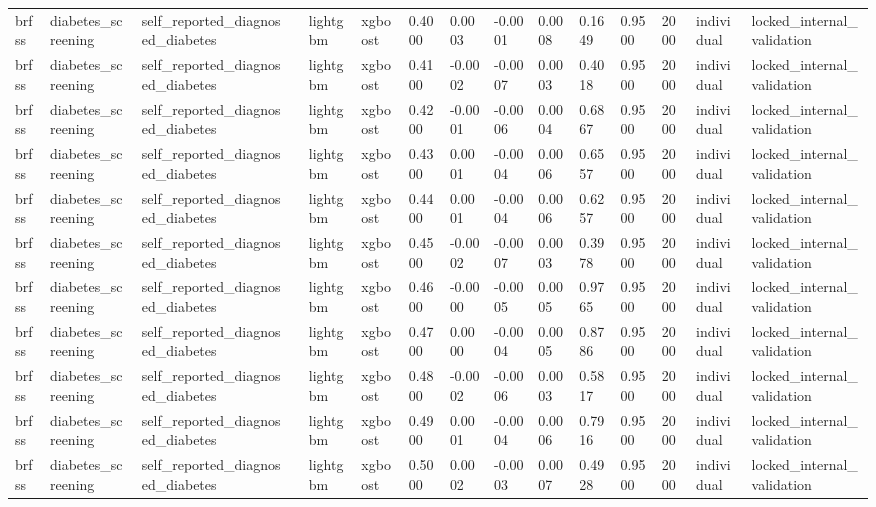 \begin{tabular}{lllllllllllllll}
brfss & diabetes\_screening & self\_reported\_diagnosed\_diabetes &  & lightgbm & xgboost & 0.4000 & 0.0003 & -0.0001 & 0.0008 & 0.1649 & 0.9500 & 2000 & individual & locked\_internal\_validation \\
brfss & diabetes\_screening & self\_reported\_diagnosed\_diabetes &  & lightgbm & xgboost & 0.4100 & -0.0002 & -0.0007 & 0.0003 & 0.4018 & 0.9500 & 2000 & individual & locked\_internal\_validation \\
brfss & diabetes\_screening & self\_reported\_diagnosed\_diabetes &  & lightgbm & xgboost & 0.4200 & -0.0001 & -0.0006 & 0.0004 & 0.6867 & 0.9500 & 2000 & individual & locked\_internal\_validation \\
brfss & diabetes\_screening & self\_reported\_diagnosed\_diabetes &  & lightgbm & xgboost & 0.4300 & 0.0001 & -0.0004 & 0.0006 & 0.6557 & 0.9500 & 2000 & individual & locked\_internal\_validation \\
brfss & diabetes\_screening & self\_reported\_diagnosed\_diabetes &  & lightgbm & xgboost & 0.4400 & 0.0001 & -0.0004 & 0.0006 & 0.6257 & 0.9500 & 2000 & individual & locked\_internal\_validation \\
brfss & diabetes\_screening & self\_reported\_diagnosed\_diabetes &  & lightgbm & xgboost & 0.4500 & -0.0002 & -0.0007 & 0.0003 & 0.3978 & 0.9500 & 2000 & individual & locked\_internal\_validation \\
brfss & diabetes\_screening & self\_reported\_diagnosed\_diabetes &  & lightgbm & xgboost & 0.4600 & -0.0000 & -0.0005 & 0.0005 & 0.9765 & 0.9500 & 2000 & individual & locked\_internal\_validation \\
brfss & diabetes\_screening & self\_reported\_diagnosed\_diabetes &  & lightgbm & xgboost & 0.4700 & 0.0000 & -0.0004 & 0.0005 & 0.8786 & 0.9500 & 2000 & individual & locked\_internal\_validation \\
brfss & diabetes\_screening & self\_reported\_diagnosed\_diabetes &  & lightgbm & xgboost & 0.4800 & -0.0002 & -0.0006 & 0.0003 & 0.5817 & 0.9500 & 2000 & individual & locked\_internal\_validation \\
brfss & diabetes\_screening & self\_reported\_diagnosed\_diabetes &  & lightgbm & xgboost & 0.4900 & 0.0001 & -0.0004 & 0.0006 & 0.7916 & 0.9500 & 2000 & individual & locked\_internal\_validation \\
brfss & diabetes\_screening & self\_reported\_diagnosed\_diabetes &  & lightgbm & xgboost & 0.5000 & 0.0002 & -0.0003 & 0.0007 & 0.4928 & 0.9500 & 2000 & individual & locked\_internal\_validation \\

\end{tabular}
